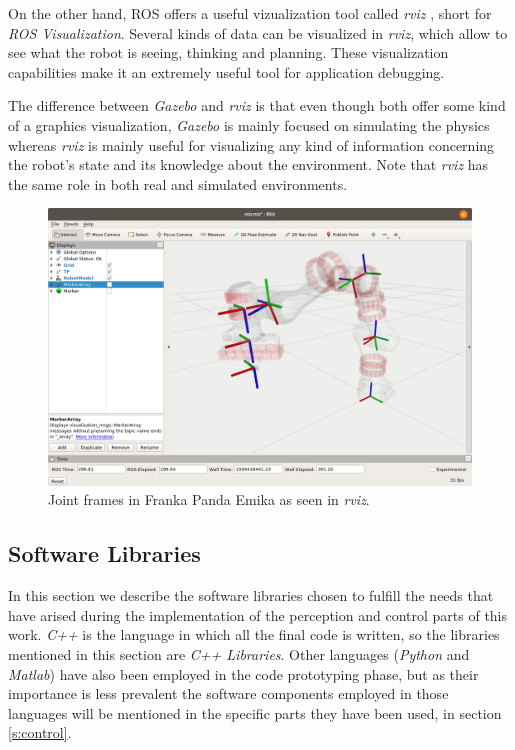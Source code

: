 On the other hand, ROS offers a useful vizualization tool called \textit{rviz} \cite{rviz}, short for \textit{ROS Visualization}. Several kinds of data can be visualized in \textit{rviz}, which allow to see what the robot is seeing, thinking and planning. These visualization capabilities make it an extremely useful tool for application debugging.

The difference between \textit{Gazebo} and \textit{rviz} is that even though both offer some kind of a graphics visualization, \textit{Gazebo} is mainly focused on simulating the physics whereas \textit{rviz} is mainly useful for visualizing any kind of information concerning the robot's state and its knowledge about the environment. Note that \textit{rviz} has the same role in both real and simulated environments.

\begin{figure}[H]
    \caption[rviz]{
        Joint frames in Franka Panda Emika as seen in \textit{rviz}.
    }
    \centering
    \includegraphics[width=\textwidth]{figs/rviz_intro.png}
\end{figure}



\subsection{Software Libraries}

In this section we describe the software libraries chosen to fulfill the needs that have arised during the implementation of the perception and control parts of this work. \textit{C++} is the language in which all the final code is written, so the libraries mentioned in this section are \textit{C++ Libraries}. Other languages (\textit{Python} and \textit{Matlab}) have also been employed in the code prototyping phase, but as their importance is less prevalent the software components employed in those languages will be mentioned in the specific parts they have been used, in section \ref{s:control}.

